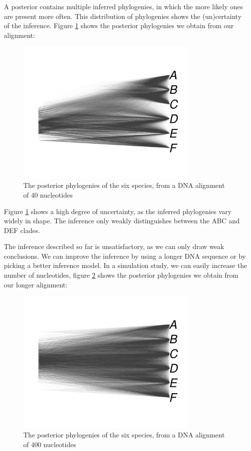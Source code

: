 A posterior contains multiple inferred phylogenies, in which the more likely
ones are present more often. This distribution of phylogenies shows the
(un)certainty of the inference. Figure \ref{fig:densitree} shows the
posterior phylogenies we obtain from our alignment:

\begin{figure}[H]
  \includegraphics[width=0.8\textwidth]{densitree_40.png}
  \caption{
    The posterior phylogenies of the six species, 
    from a DNA alignment of 40 nucleotides
  }
  \label{fig:densitree}
\end{figure}

Figure \ref{fig:densitree} shows a high degree of uncertainty, as the
inferred phylogenies vary widely in shape. The inference only
weakly distinguishes between the ABC and DEF clades. 

The inference described so far is unsatisfactory, as we can only draw 
weak conclusions. We can improve the inference by using a longer DNA sequence 
or by picking a better inference model. In a simulation study, we can
easily increase the number of nucleotides, 
figure \ref{fig:densitree_again} shows the
posterior phylogenies we obtain from our longer alignment:

\begin{figure}[H]
  \includegraphics[width=0.8\textwidth]{densitree_400.png}
  \caption{
    The posterior phylogenies of the six species,
    from a DNA alignment of 400 nucleotides
  }
  \label{fig:densitree_again}
\end{figure}

